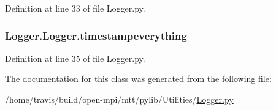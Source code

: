 Definition at line 33 of file Logger.\-py.

\hypertarget{class_logger_1_1_logger_a6012f50ab21e5ab3b89465a972b6a99d}{
\subsubsection[{timestampeverything}]{\setlength{\rightskip}{0pt plus 5cm}Logger.\-Logger.\-timestampeverything}}\label{class_logger_1_1_logger_a6012f50ab21e5ab3b89465a972b6a99d}


Definition at line 35 of file Logger.\-py.



The documentation for this class was generated from the following file\-:\begin{DoxyCompactItemize}
\item 
/home/travis/build/open-\/mpi/mtt/pylib/\-Utilities/\hyperlink{_logger_8py}{Logger.\-py}\end{DoxyCompactItemize}
